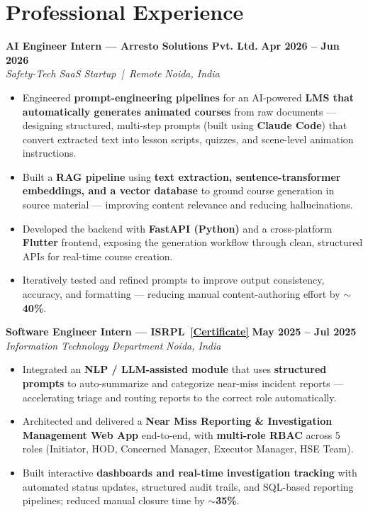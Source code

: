 \documentclass[a4paper,10.5pt]{article}
\newcommand{\resumeSubheading}[4]{%
  \noindent\textbf{\color{accent}#1} \hfill \textbf{\small#2} \\
  \noindent\textit{\small\color{gray}#3} \hfill \textit{\small\color{gray}#4} \vspace{2pt}%
}
\newcommand{\resumeItem}[1]{\item\small #1}
\begin{document}
\section*{Professional Experience}

\resumeSubheading
{AI Engineer Intern --- Arresto Solutions Pvt. Ltd.}{Apr 2026 -- Jun 2026}
{Safety-Tech SaaS Startup \,|\, Remote}{Noida, India}
\begin{itemize}
  \resumeItem{Engineered \textbf{prompt-engineering pipelines} for an AI-powered \textbf{LMS that automatically generates animated courses} from raw documents --- designing structured, multi-step prompts (built using \textbf{Claude Code}) that convert extracted text into lesson scripts, quizzes, and scene-level animation instructions.}
  \resumeItem{Built a \textbf{RAG pipeline} using \textbf{text extraction, sentence-transformer embeddings, and a vector database} to ground course generation in source material --- improving content relevance and reducing hallucinations.}
  \resumeItem{Developed the backend with \textbf{FastAPI (Python)} and a cross-platform \textbf{Flutter} frontend, exposing the generation workflow through clean, structured APIs for real-time course creation.}
  \resumeItem{Iteratively tested and refined prompts to improve output consistency, accuracy, and formatting --- reducing manual content-authoring effort by $\sim$\textbf{40\%}.}
\end{itemize}

\vspace{4pt}

\resumeSubheading
{Software Engineer Intern --- ISRPL \,\href{https://drive.google.com/file/d/18-IPNTV7WDPqWt1JuZBNGiwhsbWZ6-QL/view?usp=sharing}{\small[Certificate]}}{May 2025 -- Jul 2025}
{Information Technology Department}{Noida, India}
\begin{itemize}
  \resumeItem{Integrated an \textbf{NLP / LLM-assisted module} that uses \textbf{structured prompts} to auto-summarize and categorize near-miss incident reports --- accelerating triage and routing reports to the correct role automatically.}
  \resumeItem{Architected and delivered a \textbf{Near Miss Reporting \& Investigation Management Web App} end-to-end, with \textbf{multi-role RBAC} across 5 roles (Initiator, HOD, Concerned Manager, Executor Manager, HSE Team).}
  \resumeItem{Built interactive \textbf{dashboards and real-time investigation tracking} with automated status updates, structured audit trails, and SQL-based reporting pipelines; reduced manual closure time by $\sim$\textbf{35\%}.}
\end{itemize}
\end{document}
